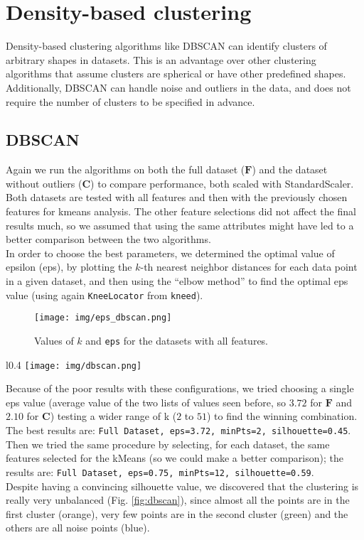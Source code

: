 \section{Density-based clustering}
Density-based clustering algorithms like DBSCAN can identify clusters of arbitrary shapes in datasets. This is an advantage over other clustering algorithms that assume clusters are spherical or have other predefined shapes. Additionally, DBSCAN can handle noise and outliers in the data, and does not require the number of clusters to be specified in advance.
\subsection{DBSCAN}
Again we run the algorithms on both the full dataset ($\mathbf{F}$) and the dataset without outliers ($\mathbf{C}$) to compare performance, both scaled with StandardScaler. Both datasets are tested with all features and then with the previously chosen features for kmeans analysis. The other feature selections did not affect the final results much, so we assumed that using the same attributes might have led to a better comparison between the two algorithms.\\
In order to choose the best parameters, we determined the optimal value of epsilon (eps), by plotting the $k$-th nearest neighbor distances for each data point in a given dataset, and then using the “elbow method” to find the optimal eps value (using again \texttt{KneeLocator} from \texttt{kneed}).
\begin{figure}[H]
    \centering
    \texttt{[image: img/eps\_dbscan.png]}
    \caption{Values of $k$ and \texttt{eps} for the datasets with all features.}
    \label{fig:enter-label}
\end{figure}
\begin{wrapfigure}{l}{0.4\textwidth}
\texttt{[image: img/dbscan.png]}
\caption{DBSCAN: Full Dataset, eps=0.75, minPts=12, sil\_score=0.59}
\vspace{-1cm}
\label{fig:dbscan}
\end{wrapfigure}
Because of the poor results with these configurations, we tried choosing a single eps value (average value of the two lists of values seen before, so $3.72$ for $\mathbf{F}$ and $2.10$ for $\mathbf{C}$) testing a wider range of k ($2$ to $51$) to find the winning combination. The best results are: \texttt{Full Dataset, eps=3.72, minPts=2, silhouette=0.45}.\\
Then we tried the same procedure by selecting, for each dataset, the same features selected for the kMeans (so we could make a better comparison); the results are: \texttt{Full Dataset, eps=0.75, minPts=12, silhouette=0.59}.\\
Despite having a convincing silhouette value, we discovered that the clustering is really very unbalanced (Fig. \ref{fig:dbscan}), since almost all the points are in the first cluster (orange), very few points are in the second cluster (green) and the others are all noise points (blue).
